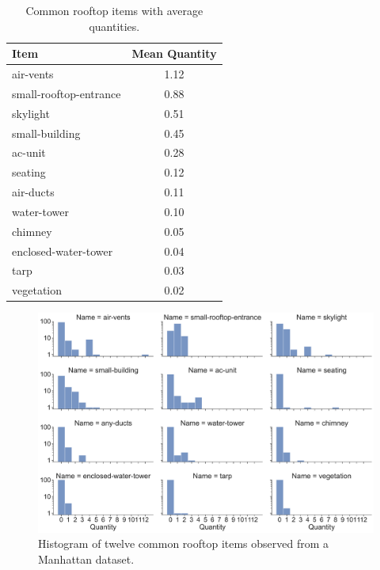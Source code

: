 \begin{table}[ht]
\centering
\caption{Common rooftop items with average quantities.}
\label{table:roof_quantity}
\begin{tabular}{@{}lc@{}}
\toprule
Item                   & Mean Quantity \\ \midrule
air-vents              & 1.12          \\
small-rooftop-entrance & 0.88          \\
skylight               & 0.51          \\
small-building         & 0.45          \\
ac-unit                & 0.28          \\
seating                & 0.12          \\
air-ducts              & 0.11          \\
water-tower            & 0.10          \\
chimney                & 0.05          \\
enclosed-water-tower   & 0.04          \\
tarp                   & 0.03          \\
vegetation             & 0.02          \\ \bottomrule
\end{tabular}
\end{table}

\begin{figure}[ht!]
\centering
\includegraphics[width=.80\linewidth]{chapter_6_landingsim/figs/hist.pdf}
\caption[Histogram of twelve common rooftop items observed from a Manhattan dataset]{Histogram of twelve common rooftop items observed from a Manhattan dataset. }
\label{fig:ch6_histogram_sampling}
\end{figure}


